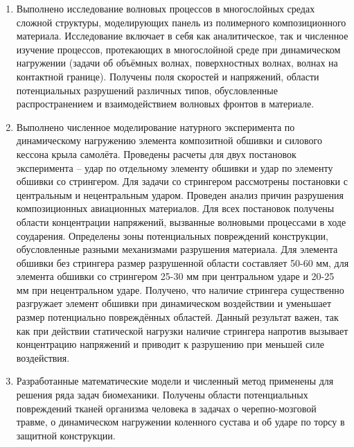 \begin{enumerate}
\item Выполнено исследование волновых процессов в многослойных средах сложной структуры, моделирующих панель из полимерного композиционного материала. Исследование включает в себя как аналитическое, так и численное изучение процессов, протекающих в многослойной среде при динамическом нагружении (задачи об объёмных волнах, поверхностных волнах, волнах на контактной границе). Получены поля скоростей и напряжений, области потенциальных разрушений различных типов, обусловленные распространением и взаимодействием волновых фронтов в материале.

\item Выполнено численное моделирование натурного эксперимента по динамическому нагружению элемента композитной обшивки и силового кессона крыла самолёта. Проведены расчеты для двух постановок эксперимента -- удар по отдельному элементу обшивки и удар по элементу обшивки со стрингером. Для задачи со стрингером рассмотрены постановки с центральным и нецентральным ударом. Проведен анализ причин разрушения композиционных авиационных материалов. Для всех постановок получены области концентрации напряжений, вызванные волновыми процессами в ходе соударения. Определены зоны потенциальных повреждений конструкции, обусловленные разными механизмами разрушения материала. Для элемента обшивки без стрингера размер разрушенной области составляет 50-60 мм, для элемента обшивки со стрингером 25-30 мм при центральном ударе и 20-25 мм при нецентральном ударе. Получено, что наличие стрингера существенно разгружает элемент обшивки при динамическом воздействии и уменьшает размер потенциально повреждённых областей. Данный результат важен, так как при действии статической нагрузки наличие стрингера напротив вызывает концентрацию напряжений и приводит к разрушению при меньшей силе воздействия.

\item Разработанные математические модели и численный метод применены для решения ряда задач биомеханики. Получены области потенциальных повреждений тканей организма человека в задачах о черепно-мозговой травме, о динамическом нагружении коленного сустава и об ударе по торсу в защитной конструкции.

\end{enumerate}
